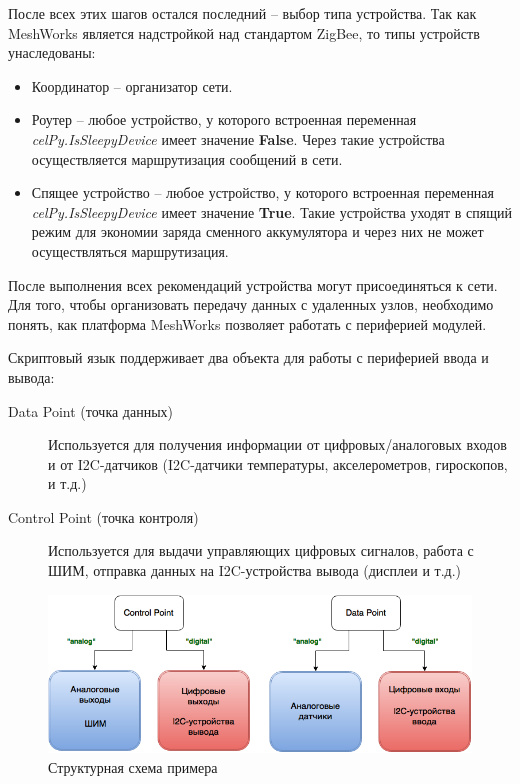 \documentclass[11pt]{article}
\begin{document}
После всех этих шагов остался последний -- выбор типа устройства. Так как MeshWorks 
является надстройкой над стандартом ZigBee, то типы устройств унаследованы:
\begin{itemize}
    \item Координатор -- организатор сети.
    \item Роутер -- любое устройство, у которого встроенная переменная 
    \emph{celPy.IsSleepyDevice} имеет значение \textbf{False}. Через такие устройства
    осуществляется маршрутизация сообщений в сети.
    \item Спящее устройство -- любое устройство, у которого встроенная переменная 
    \emph{celPy.IsSleepyDevice} имеет значение \textbf{True}. Такие устройства уходят
    в спящий режим для экономии заряда сменного аккумулятора и через них не может
    осуществляться маршрутизация.
\end{itemize}

После выполнения всех рекомендаций устройства могут присоединяться к сети. Для того, чтобы
организовать передачу данных с удаленных узлов, необходимо понять, как платформа 
MeshWorks позволяет работать с периферией модулей.

Скриптовый язык поддерживает два объекта для работы с периферией ввода и вывода:

\begin{description}
    \item[Data Point (точка данных)] Используется для получения информации от 
    цифровых/аналоговых входов и от I2C-датчиков (I2C-датчики температуры, акселерометров,
    гироскопов, и т.д.)
    \item[Control Point (точка контроля)] Используется для выдачи управляющих цифровых 
    сигналов, работа с ШИМ, отправка данных на I2C-устройства вывода (дисплеи и т.д.)
\end{description}

\begin{figure}[h!]
    \centering
    \includegraphics[scale=0.5]{DC_points.png}
    \caption{Структурная схема примера}
\end{figure}
\end{document}
